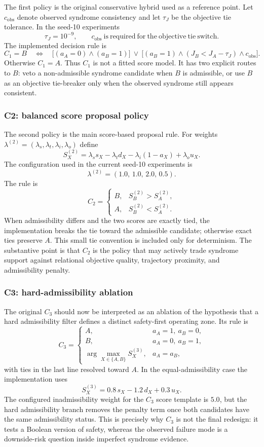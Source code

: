 \documentclass[11pt,a4paper]{article}
\theoremstyle{definition}
\theoremstyle{remark}
\begin{document}
The first policy is the original conservative hybrid used as a reference point.  Let
$c_{\mathrm{obs}}$ denote observed syndrome consistency and let $\tau_J$ be the
objective tie tolerance.  In the seed-10 experiments
\[
\tau_J=10^{-9},
\qquad
c_{\mathrm{obs}}\ \mathrm{is\ required\ for\ the\ objective\ tie\ switch}.
\]
The implemented decision rule is
\[
C_1=B
\quad\Longleftrightarrow\quad
\bigl[(a_A=0)\wedge(a_B=1)\bigr]
\ \vee\
\bigl[(a_B=1)\wedge(J_B<J_A-\tau_J)\wedge c_{\mathrm{obs}}\bigr].
\]
Otherwise $C_1=A$.  Thus $C_1$ is not a fitted score model.  It has two explicit
routes to $B$: veto a non-admissible syndrome candidate when $B$ is admissible, or use
$B$ as an objective tie-breaker only when the observed syndrome still appears
consistent.

\subsubsection*{C2: balanced score proposal policy}

The second policy is the main score-based proposal rule.  For weights
$\lambda^{(2)}=(\lambda_s,\lambda_t,\lambda_i,\lambda_o)$ define
\[
S_X^{(2)}
=
\lambda_s s_X
-\lambda_t d_X
-\lambda_i(1-a_X)
+\lambda_o u_X.
\]
The configuration used in the current seed-10 experiments is
\[
\lambda^{(2)}=(1.0,\,1.0,\,2.0,\,0.5).
\]
The rule is
\[
C_2
=
\begin{cases}
B, & S_B^{(2)}>S_A^{(2)},\\
A, & S_B^{(2)}<S_A^{(2)}.
\end{cases}
\]
When admissibility differs and the two scores are exactly tied, the implementation
breaks the tie toward the admissible candidate; otherwise exact ties preserve $A$.
This small tie convention is included only for determinism.  The substantive point is
that $C_2$ is the policy that may actively trade syndrome support against relational
objective quality, trajectory proximity, and admissibility penalty.

\subsubsection*{C3: hard-admissibility ablation}

The original $C_3$ should now be interpreted as an ablation of the hypothesis that a
hard admissibility filter defines a distinct safety-first operating zone.  Its rule is
\[
C_3
=
\begin{cases}
A, & a_A=1,\ a_B=0,\\
B, & a_A=0,\ a_B=1,\\
\arg\max_{X\in\{A,B\}} S_X^{(3)}, & a_A=a_B,
\end{cases}
\]
with ties in the last line resolved toward $A$.  In the equal-admissibility case the
implementation uses
\[
S_X^{(3)}
=
0.8\,s_X
-1.2\,d_X
+0.3\,u_X.
\]
The configured inadmissibility weight for the $C_3$ score template is $5.0$, but the
hard admissibility branch removes the penalty term once both candidates have the same
admissibility status.  This is precisely why $C_3$ is not the final redesign: it tests
a Boolean version of safety, whereas the observed failure mode is a downside-risk
question inside imperfect syndrome evidence.
\end{document}
